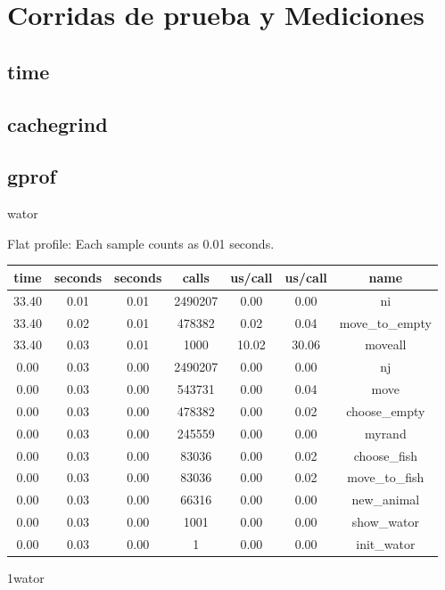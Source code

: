 \documentclass[a4paper,10pt]{article}
\begin{document}
\newpage

\section{Corridas de prueba y Mediciones}

\subsection{time}


\subsection{cachegrind}

\subsection{gprof}
wator

Flat profile:
Each sample counts as 0.01 seconds.
\begin{center}
  \begin{tabular}{| c | c | c | c | c | c | c |}
    \hline
 time &   seconds &   seconds &    calls &  us/call &   us/call &   name \\ \hline    
 33.40 &      0.01 &     0.01 &  2490207 &     0.00 &      0.00 &   ni \\ \hline
 33.40 &      0.02 &     0.01 &   478382 &     0.02 &      0.04 &   move\_to\_empty \\ \hline
 33.40 &      0.03 &     0.01 &     1000 &    10.02 &     30.06 &   moveall \\ \hline
  0.00 &      0.03 &     0.00 &  2490207 &     0.00 &      0.00 &   nj \\ \hline
  0.00 &      0.03 &     0.00 &   543731 &     0.00 &      0.04 &   move \\ \hline
  0.00 &      0.03 &     0.00 &   478382 &     0.00 &      0.02 &   choose\_empty \\ \hline
  0.00 &      0.03 &     0.00 &   245559 &     0.00 &      0.00 &   myrand \\ \hline
  0.00 &      0.03 &     0.00 &    83036 &     0.00 &      0.02 &   choose\_fish \\ \hline
  0.00 &      0.03 &     0.00 &    83036 &     0.00 &      0.02 &   move\_to\_fish \\ \hline
  0.00 &      0.03 &     0.00 &    66316 &     0.00 &      0.00 &   new\_animal \\ \hline
  0.00 &      0.03 &     0.00 &     1001 &     0.00 &      0.00 &   show\_wator \\ \hline
  0.00 &      0.03 &     0.00 &        1 &     0.00 &      0.00 &   init\_wator \\ \hline
  \end{tabular}
\end{center}
1wator
\end{document}
